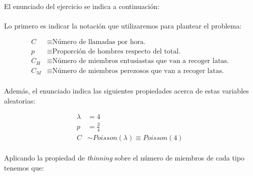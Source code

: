 \documentclass[a4paper, spanish]{article}
\begin{document}
    \paragraph{}
    El enunciado del ejercicio se indica a continuación:


    \begin{displayquote}
    \end{displayquote}


    \paragraph{}
    Lo primero es indicar la notación que utilizaremos para plantear el problema:

    \begin{align*}
      C &\equiv \text{Número de llamadas por hora.} \\
      p &\equiv \text{Proporción de hombres respecto del total.} \\
      C_H &\equiv \text{Número de miembros entusiastas que van a recoger latas.} \\
      C_M &\equiv \text{Número de miembros perezosos que van a recoger latas.}
    \end{align*}

    \paragraph{}
    Además, el enunciado indica las siguientes propiedades acerca de estas variables aleatorias:

    \begin{align*}
      \lambda &= 4 \\
      p &= \frac{3}{4} \\
      C &\sim Poisson(\lambda) \equiv Poisson(4)
    \end{align*}

    \paragraph{}
    Aplicando la propiedad de \emph{thinning} sobre el número de miembros de cada tipo tenemos que:
\end{document}
